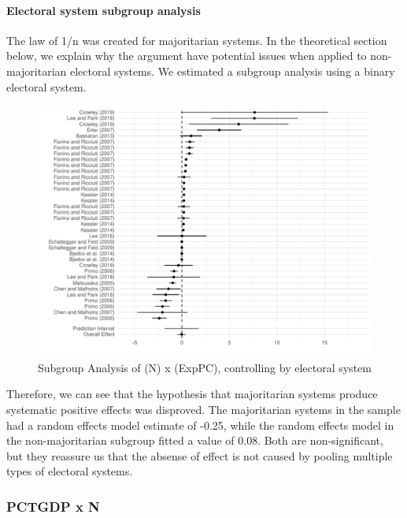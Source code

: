 \documentclass[
]{article}
\begin{document}
\newpage

\hypertarget{electoral-system-subgroup-analysis-1}{%
\paragraph{Electoral system subgroup
analysis}\label{electoral-system-subgroup-analysis-1}}

The law of 1/n was created for majoritarian systems. In the theoretical
section below, we explain why the argument have potential issues when
applied to non-majoritarian electoral systems. We estimated a subgroup
analysis using a binary electoral system.

\begin{figure}
\centering
\includegraphics{appendixV5_files/figure-latex/unnamed-chunk-33-1.pdf}
\caption{Subgroup Analysis of (N) x (ExpPC), controlling by electoral
system}
\end{figure}

Therefore, we can see that the hypothesis that majoritarian systems
produce systematic positive effects was disproved. The majoritarian
systems in the sample had a random effects model estimate of -0.25,
while the random effects model in the non-majoritarian subgroup fitted a
value of 0.08. Both are non-significant, but they reassure us that the
absense of effect is not caused by pooling multiple types of electoral
systems.

\newpage

\hypertarget{pctgdp-x-n-1}{%
\subsubsection{PCTGDP x N}\label{pctgdp-x-n-1}}
\end{document}
